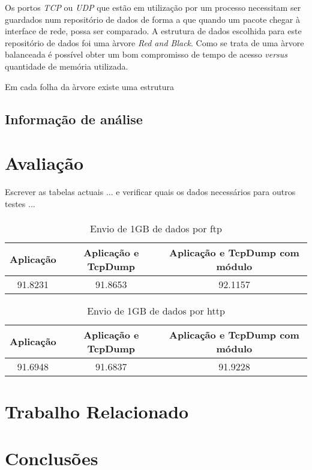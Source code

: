 \documentclass[runningheads,a4paper]{llncs}
\begin{document}
Os portos \textit{TCP} ou \textit{UDP} que estão em utilização por um processo necessitam ser guardados num repositório de dados de forma a que quando um pacote chegar à interface de rede, possa ser comparado. 
A estrutura de dados escolhida para este repositório de dados foi uma àrvore \textit{Red and Black}. Como se trata de uma àrvore balanceada é possível obter um bom compromisso de tempo de acesso \textit{versus} quantidade de memória utilizada.

Em cada folha da àrvore existe uma estrutura 

\subsection*{Informação de análise}
\label{sub:data_information}

\section{Avaliação}
\label{sec:evaluation}

Escrever as tabelas actuais ... e verificar quais os dados necessários para outros testes ...
\paragraph*{}

\begin{table}
\caption{Envio de 1GB de dados por ftp}
\begin{tabular}{| c | c | c |}
\hline
\hspace {1cm} Aplicação \hspace {1cm} & Aplicação e TcpDump & Aplicação e TcpDump com módulo \\
\hline
91.8231 & 91.8653 & 92.1157 \\
\hline
\end{tabular}
\end{table}

\begin{center}
\begin{table}
\caption{Envio de 1GB de dados por http}
\begin{tabular}{ | c | c | c  | }
\hline
\hspace {1cm} Aplicação \hspace {1cm} & Aplicação e TcpDump & Aplicação e TcpDump com módulo \\
\hline
91.6948 & 91.6837 & 91.9228 \\
\hline
\end{tabular}
\end{table}
\end{center}

\section{Trabalho Relacionado}
\label{sec:related_work}

\section{Conclusões}
\label{sec:conclusions}




\end{document}
